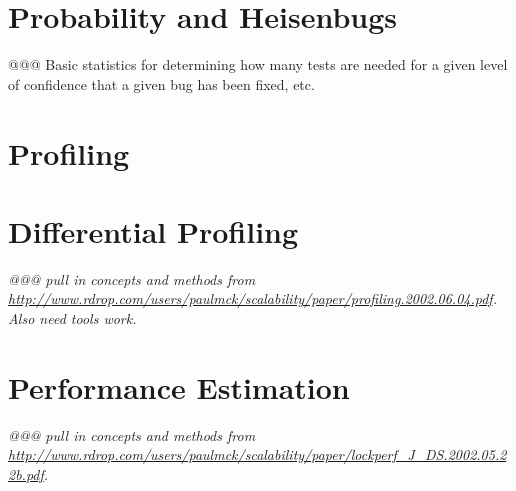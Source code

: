 

\section{Probability and Heisenbugs}
\label{sec:analysis:Probability and Heisenbugs}

@@@ Basic statistics for determining how many tests are needed for a
given level of confidence that a given bug has been fixed, etc.

\section{Profiling}
\label{sec:analysis:Profiling}

\section{Differential Profiling}
\label{sec:analysis:Differential Profiling}

{\em @@@ pull in concepts and methods from
\url{http://www.rdrop.com/users/paulmck/scalability/paper/profiling.2002.06.04.pdf}.
Also need tools work.}

\section{Performance Estimation}
\label{sec:analysis:Performance Estimation}

{\em @@@ pull in concepts and methods from
\url{http://www.rdrop.com/users/paulmck/scalability/paper/lockperf_J_DS.2002.05.22b.pdf}.}
